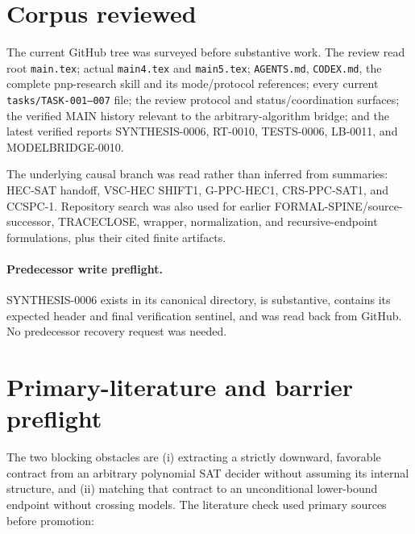 \documentclass[11pt]{article}
\begin{document}
\section{Corpus reviewed}

The current GitHub tree was surveyed before substantive work.  The review read
root \texttt{main.tex}; actual \texttt{main4.tex} and \texttt{main5.tex};
\texttt{AGENTS.md}, \texttt{CODEX.md}, the complete pnp-research skill and its
mode/protocol references; every current \texttt{tasks/TASK-001--007} file; the
review protocol and status/coordination surfaces; the verified MAIN history
relevant to the arbitrary-algorithm bridge; and the latest verified reports
SYNTHESIS-0006, RT-0010, TESTS-0006, LB-0011, and MODELBRIDGE-0010.

The underlying causal branch was read rather than inferred from summaries:
HEC-SAT handoff, VSC-HEC SHIFT1, G-PPC-HEC1, CRS-PPC-SAT1, and CCSPC-1.
Repository search was also used for earlier FORMAL-SPINE/source-successor,
TRACECLOSE, wrapper, normalization, and recursive-endpoint formulations, plus
their cited finite artifacts.

\paragraph{Predecessor write preflight.}
SYNTHESIS-0006 exists in its canonical directory, is substantive, contains its
expected header and final verification sentinel, and was read back from GitHub.
No predecessor recovery request was needed.

\section{Primary-literature and barrier preflight}

The two blocking obstacles are (i) extracting a strictly downward, favorable
contract from an arbitrary polynomial SAT decider without assuming its
internal structure, and (ii) matching that contract to an unconditional
lower-bound endpoint without crossing models.  The literature check used
primary sources before promotion:
\end{document}
